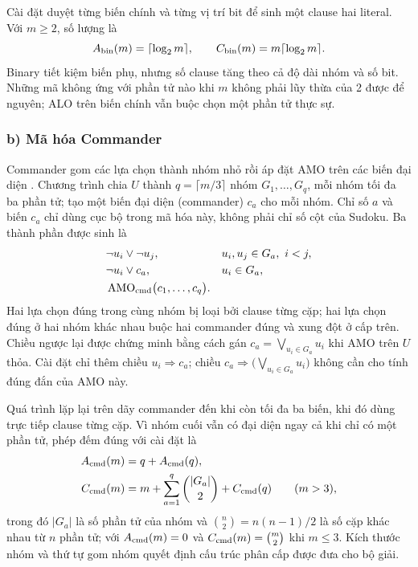 \documentclass[a4paper]{cas-sc}
\newcommand{\AMO}{\operatorname{AMO}}
\begin{document}
Cài đặt duyệt từng biến chính và từng vị trí bit để sinh một clause hai literal. Với $m\ge2$, số lượng là
\begin{equation}
A_{\rm bin}(m)=\lceil\log_2m\rceil,\qquad
C_{\rm bin}(m)=m\lceil\log_2m\rceil.
\end{equation}
Binary tiết kiệm biến phụ, nhưng số clause tăng theo cả độ dài nhóm và số bit. Những mã không ứng với phần tử nào khi $m$ không phải lũy thừa của 2 được để nguyên; ALO trên biến chính vẫn buộc chọn một phần tử thực sự.

\subsubsection*{b) Mã hóa Commander}
Commander gom các lựa chọn thành nhóm nhỏ rồi áp đặt AMO trên các biến đại diện \citep{klieber2007}. Chương trình chia $U$ thành $q=\lceil m/3\rceil$ nhóm $G_1,\ldots,G_q$, mỗi nhóm tối đa ba phần tử; tạo một biến đại diện (commander) $c_a$ cho mỗi nhóm. Chỉ số $a$ và biến $c_a$ chỉ dùng cục bộ trong mã hóa này, không phải chỉ số cột của Sudoku. Ba thành phần được sinh là
\begin{equation}\label{eq:commander}
\begin{aligned}
&\neg u_i\lor\neg u_j,
&&u_i,u_j\in G_a,\ i<j,\\
&\neg u_i\lor c_a,
&&u_i\in G_a,\\
&\AMO_{\rm cmd}\bigl(c_1,\ldots,c_q\bigr).
\end{aligned}
\end{equation}
Hai lựa chọn đúng trong cùng nhóm bị loại bởi clause từng cặp; hai lựa chọn đúng ở hai nhóm khác nhau buộc hai commander đúng và xung đột ở cấp trên. Chiều ngược lại được chứng minh bằng cách gán $c_a=\bigvee_{u_i\in G_a}u_i$ khi AMO trên $U$ thỏa. Cài đặt chỉ thêm chiều $u_i\Rightarrow c_a$; chiều $c_a\Rightarrow\bigl(\bigvee_{u_i\in G_a}u_i\bigr)$ không cần cho tính đúng đắn của AMO này.

Quá trình lặp lại trên dãy commander đến khi còn tối đa ba biến, khi đó dùng trực tiếp clause từng cặp. Vì nhóm cuối vẫn có đại diện ngay cả khi chỉ có một phần tử, phép đếm đúng với cài đặt là
\begin{equation}\label{eq:commander-count}
\begin{aligned}
A_{\rm cmd}(m)&=q+A_{\rm cmd}(q),\\
C_{\rm cmd}(m)&=m+\sum_{a=1}^{q}\binom{|G_a|}{2}+C_{\rm cmd}(q)
\qquad(m>3),
\end{aligned}
\end{equation}
trong đó $|G_a|$ là số phần tử của nhóm và $\binom n2=n(n-1)/2$ là số cặp khác nhau từ $n$ phần tử; với $A_{\rm cmd}(m)=0$ và $C_{\rm cmd}(m)=\binom m2$ khi $m\le3$. Kích thước nhóm và thứ tự gom nhóm quyết định cấu trúc phân cấp được đưa cho bộ giải.
\end{document}
